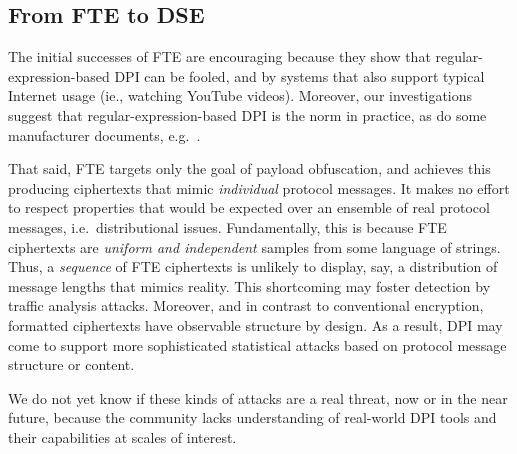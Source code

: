 \subsection{From FTE to DSE}
\label{subsec:beyond_FTE}
The initial successes of FTE are encouraging because they show that
regular-expression-based DPI can be fooled, and by systems that also
support typical Internet usage (ie., watching YouTube videos).
Moreover, our investigations suggest that regular-expression-based DPI
is the norm in practice, as do some manufacturer
documents, e.g.~\cite{bluecoat-best-practices}.

That said, FTE targets only the goal of
payload obfuscation, and achieves this producing ciphertexts that mimic \textit{individual} 
protocol messages.  It makes no effort to respect properties that
would be expected over an ensemble of real protocol messages, i.e.\
distributional issues.  Fundamentally, this is because FTE ciphertexts
are \textit{uniform and independent} samples from some language of strings.
Thus, a \textit{sequence} of FTE ciphertexts is unlikely to display,
say, a distribution of message lengths that mimics reality.  This shortcoming may foster
detection by traffic analysis attacks.  Moreover, and in contrast to conventional
encryption, formatted ciphertexts have observable structure by design.
As a result, DPI may come to support more sophisticated statistical attacks
based on protocol message structure or content.

We do not yet know if these kinds of attacks are a real
threat, now or in the near future, because the community lacks
understanding of real-world DPI tools and their capabilities at scales
of interest.

